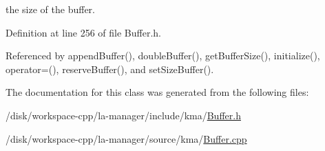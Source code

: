 the size of the buffer. 



Definition at line 256 of file Buffer.h.

Referenced by appendBuffer(), doubleBuffer(), getBufferSize(), initialize(), operator=(), reserveBuffer(), and setSizeBuffer().

The documentation for this class was generated from the following files:\begin{CompactItemize}
\item 
/disk/workspace-cpp/la-manager/include/kma/\hyperlink{Buffer_8h}{Buffer.h}\item 
/disk/workspace-cpp/la-manager/source/kma/\hyperlink{Buffer_8cpp}{Buffer.cpp}\end{CompactItemize}

